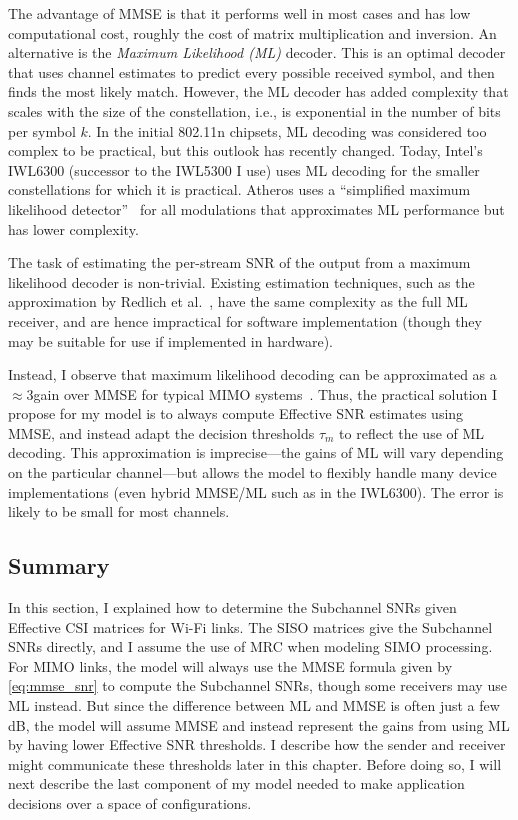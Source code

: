 The advantage of MMSE is that it performs well in most cases and has low computational cost, roughly the cost of matrix multiplication and inversion. An alternative is the \emph{Maximum Likelihood (ML)} decoder. This is an optimal decoder that uses channel estimates to predict every possible received symbol, and then finds the most likely match. However, the ML decoder has added complexity that scales with the size of the constellation, i.e., is exponential in the number of bits per symbol $k$. In the initial 802.11n chipsets, ML decoding was considered too complex to be practical, but this outlook has recently changed. Today, Intel's IWL6300 (successor to the IWL5300 I use) uses ML decoding for the smaller constellations for which it is practical. Atheros uses a ``simplified maximum likelihood detector''~\cite{ar6004,Atheros_11nTechPaper} for all modulations that approximates ML performance but has lower complexity.

The task of estimating the per-stream SNR of the output from a maximum likelihood decoder is non-trivial. Existing estimation techniques, such as the approximation by Redlich et al.~\cite{Redlich_MLSNR}, have the same complexity as the full ML receiver, and are hence impractical for software implementation (though they may be suitable for use if implemented in hardware).

Instead, I observe that maximum likelihood decoding can be approximated as a $\approx$3\dB gain over MMSE for typical MIMO systems~\cite{Kumar_ml_mmse}. Thus, the practical solution I propose for my model is to always compute Effective SNR estimates using MMSE, and instead adapt the decision thresholds $\tau_m$ to reflect the use of ML decoding. This approximation is imprecise---the gains of ML will vary depending on the particular channel---but allows the model to flexibly handle many device implementations (even hybrid MMSE/ML such as in the IWL6300). The error is likely to be small for most channels.

\subsection{Summary}
In this section, I explained how to determine the Subchannel SNRs given Effective CSI matrices for Wi-Fi links. The SISO matrices give the Subchannel SNRs directly, and I assume the use of MRC when modeling SIMO processing.
For MIMO links, the model will always use the MMSE formula given by \eqref{eq:mmse_snr} to compute the Subchannel SNRs, though some receivers may use ML instead. But since the difference between ML and MMSE is often just a few dB, the model will assume MMSE and instead represent the gains from using ML by having lower Effective SNR thresholds. I describe how the sender and receiver might communicate these thresholds later in this chapter. Before doing so, I will next describe the last component of my model needed to make application decisions over a space of configurations.

